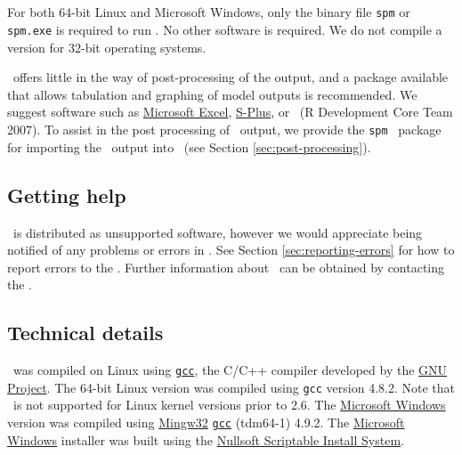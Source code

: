 \subsection{}

For both 64-bit Linux and Microsoft Windows, only the binary file \texttt{spm} or \texttt{spm.exe} is required to run \SPM . No other software is required. We do not compile a version for 32-bit operating systems. 

\SPM\ offers little in the way of  post-processing of the output, and a package available that allows tabulation and graphing of model outputs is recommended. We suggest software such as \href{http://www.microsoft.com}{Microsoft Excel}, \href{http://www.insightful.com}{S-Plus}, or \href{http://www.r-project.org}{\R}\ (R Development Core Team 2007). To assist in the post processing of \SPM\ output, we provide the \texttt{spm} \R\ package for importing the \SPM\ output into \R\ (see Section \ref{sec:post-processing}).

\subsection{Getting help}

\SPM\ is distributed as unsupported software, however we would appreciate being notified of any problems or errors in \SPM. See Section \ref{sec:reporting-errors} for how to report errors to the \authors. Further information about \SPM\ can be obtained by contacting the \authors.

\subsection{Technical details}

\SPM\ was compiled on Linux using \href{http://gcc.gnu.org}{\texttt{gcc}}, the C/C++ compiler developed by the \href{http://gcc.gnu.org}{GNU Project}. The 64-bit Linux  version was compiled using \texttt{gcc} version 4.8.2. Note that \SPM\ is not supported for Linux kernel versions prior to 2.6. The \href{http://www.microsoft.com}{Microsoft Windows} version was compiled using \href{http://www.mingw.org}{Mingw32} \href{http://gcc.gnu.org}{\texttt{gcc}} (tdm64-1) 4.9.2. The \href{http://www.microsoft.com}{Microsoft Windows} installer was built using the \href{http://nsis.sourceforge.net/Main_Page}{Nullsoft Scriptable Install System}.

